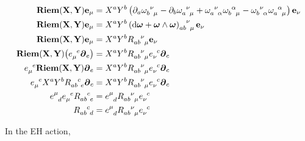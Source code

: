 \begin{align*}
    \textbf{Riem}\qty(\vb X,\vb Y)\vb e_\mu&=X^aY^b\left(\partial_{a}\tensor{\omega}{_b^\nu_\mu}-\partial_{b}\tensor{\omega}{_a^\nu_\mu}+\tensor{\omega}{_a^\nu_\alpha}\tensor{\omega}{_b^\alpha_\mu}-\tensor{\omega}{_b^\nu_\alpha}\tensor{\omega}{_a^\alpha_\mu}\right)\vb e_\nu\\
    \textbf{Riem}\qty(\vb X,\vb Y)\vb e_\mu&=X^aY^b\tensor{\left(\dd{\boldsymbol\omega}+\boldsymbol\omega\wedge\boldsymbol\omega\right)}{_a_b^\nu_\mu}\vb e_\nu\\
    \textbf{Riem}\qty(\vb X,\vb Y)\vb e_\mu&=X^aY^b\tensor{R}{_a_b^\nu_\mu}\vb e_\nu\\
    \textbf{Riem}\qty(\vb X,\vb Y)\qty(\tensor{e}{_\mu^e}\boldsymbol\partial_e)&=X^aY^b\tensor{R}{_a_b^\nu_\mu}\tensor{e}{_\nu^c}\boldsymbol\partial_c\\
    \tensor{e}{_\mu^e}\textbf{Riem}\qty(\vb X,\vb Y)\boldsymbol\partial_e&=X^aY^b\tensor{R}{_a_b^\nu_\mu}\tensor{e}{_\nu^c}\boldsymbol\partial_c\\
    \tensor{e}{_\mu^e}X^aY^b\tensor{R}{_a_b^c_e}\boldsymbol\partial_c&=X^aY^b\tensor{R}{_a_b^\nu_\mu}\tensor{e}{_\nu^c}\boldsymbol\partial_c\\
    \tensor{e}{^\mu_d}\tensor{e}{_\mu^e}\tensor{R}{_a_b^c_e}&=\tensor{e}{^\mu_d}\tensor{R}{_a_b^\nu_\mu}\tensor{e}{_\nu^c}\\
    \tensor{R}{_a_b^c_d}&=\tensor{e}{^\mu_d}\tensor{R}{_a_b^\nu_\mu}\tensor{e}{_\nu^c}
\end{align*}

In the EH action,


